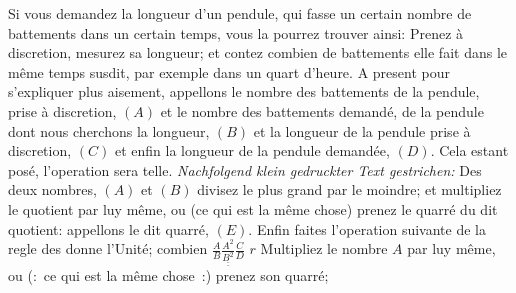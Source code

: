 \count{}
	\count{}
\vspace*{8mm}
\pstart\normalsize\noindent%
[56~v\textsuperscript{o}]
Si vous demandez la longueur d'un pendule,\protect{}
qui fasse un certain nombre de batte\-ments dans un certain temps,
vous la pourrez trouver ainsi:%
\pend%
\pstart %
Prenez
\`{a} discretion, mesurez sa longueur; et contez combien de batte\-ments elle fait dans le m\^{e}me temps susdit, par exemple dans un quart d'heure.
\pend%
\pstart%
A present pour s'expliquer plus aisement, appellons le nombre des battements de  la pendule, prise \`{a} discretion, \textit{$(A)$} et le nombre des battements  demand\'{e}, de la pendule dont nous cherchons la longueur, \textit{$(B)$}  et la longueur de la pendule prise \`{a} discretion, \textit{$(C)$}  et enfin la longueur de la pendule demand\'{e}e, \textit{$(D)$}.
Cela estant pos\'{e}, l'operation sera telle.
\pend%
\vspace*{2.0em}%
\pstart\noindent%
\lbrack%
\textit{Nachfolgend klein gedruckter Text gestrichen:}%
\rbrack %
\pend%
\vspace*{0.5em}
\pstart\noindent\footnotesize%
Des deux nombres, $(A)$ et $(B)$ divisez le plus grand par le moindre;
et multipliez le quotient par luy m\^{e}me, ou (ce qui est  la m\^{e}me chose) prenez le quarr\'{e} du dit quotient:
appellons le dit quarr\'{e}, $(E)$.%
\pend%
\pstart\footnotesize%
Enfin faites l'operation suivante de la regle des
donne l'Unit\'{e}; combien%
\pend%
\vspace*{1mm}%
\pstart\footnotesize%
$\displaystyle\frac{A}{B}$\hspace*{2mm}$\displaystyle\frac{A^{2}}{\underline{\underline{{B}^{2}}}}$\hspace*{2mm}$\displaystyle\frac{C}{D}$
\pend%
\pstart%
\vspace{0,8mm}\hspace*{6mm}$r$
\pend%
\vspace*{1.5em}%
\pstart\normalsize\noindent%
Multipliez le nombre $A$ par luy m\^{e}me, ou (:~ce qui est la m\^{e}me chose~:) prenez son quarr\'{e};
